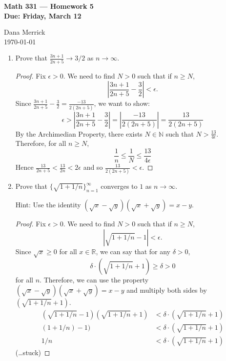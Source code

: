 \documentclass[12pt]{amsart}
\begin{document}
\thispagestyle{empty}

\begin{center}
{\bf Math 331  --- Homework 5 \\
Due:  Friday, March 12}
\end{center}

\bigskip

\noindent
Dana Merrick \\
\today

\bigskip

\begin{enumerate}

\setlength{\itemsep}{6pt}


\item Prove that $\frac{3n+1}{2n+5}\rightarrow 3/2$ as
  $n\rightarrow\infty$.
  
\begin{proof}
Fix $\epsilon>0$. We need to find $N>0$ such that if $n\ge N$,
\[ \left|\frac{3n+1}{2n+5} - \frac 3 2\right| < \epsilon.\]
Since $\frac{3n+1}{2n+5} - \frac 3 2 = \frac{-13}{2(2n+5)}$, we want to show:
\[ \epsilon > \left|\frac{3n+1}{2n+5} - \frac 3 2\right| = \left|\frac{-13}{2(2n+5)}\right| = \frac{13}{2(2n+5)} \]
By the Archimedian Property, there exists $N\in\mathbb N$ such that $N>\frac{13}{4\epsilon}$. Therefore, for all $n\ge N$,
\[\frac 1 n \le \frac 1 N \le \frac{13}{4\epsilon}\]
Hence $\frac{13}{2n+5} < \frac{13}{2n} < 2\epsilon$ and so $\frac{13}{2(2n+5)} < \epsilon$.
\end{proof}

\item Prove that $\{\sqrt{1+1/n} \}_{n=1}^\infty$ converges to $1$ as $n\rightarrow \infty$. 

Hint:  Use the identity $(\sqrt{x}-\sqrt{y})(\sqrt{x}+\sqrt{y})=x-y$.
  
\begin{proof}
Fix $\epsilon>0$. We need to find $N>0$ such that if $n\ge N$,
\[ \left| \sqrt{1+1/n} - 1\right| < \epsilon.\]
Since $\sqrt x \ge 0$ for all $x\in\mathbb R$, we can say that for any $\delta  > 0$,
\[  \delta\cdot(\sqrt{1+1/n} + 1) \ge \delta > 0 \]
for all $n$. Therefore, we can use the property $(\sqrt{x}-\sqrt{y})(\sqrt{x}+\sqrt{y})=x-y$ and multiply both sides by $(\sqrt{1+1/n} + 1)$.
\begin{align*}
(\sqrt{1+1/n} - 1)(\sqrt{1+1/n} + 1) &< \delta\cdot(\sqrt{1+1/n} + 1)\\
(1+1/n) - 1) &< \delta\cdot(\sqrt{1+1/n} + 1) \\
1/n &< \delta\cdot(\sqrt{1+1/n} + 1)
\end{align*}
(\ldots stuck)
\end{proof}


\end{enumerate}
\end{document}
